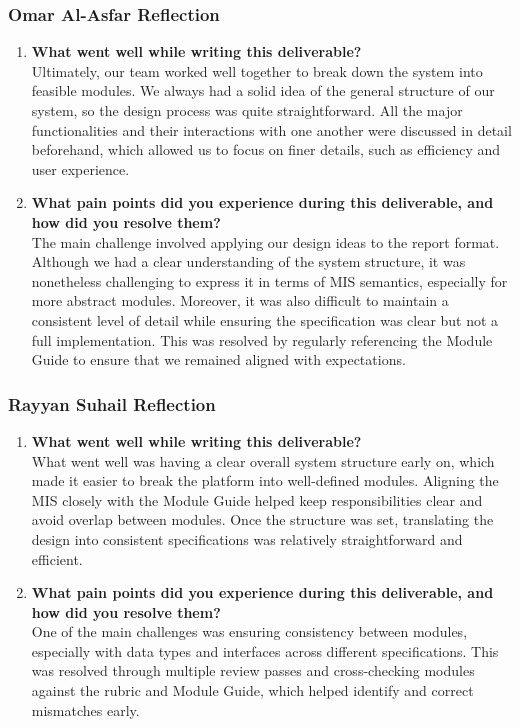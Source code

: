 \documentclass[12pt, titlepage]{article}
\begin{document}
\subsubsection*{Omar Al-Asfar Reflection}
\begin{enumerate}
 \item \textbf{What went well while writing this deliverable?} \\
 Ultimately, our team worked well together to break down the system into feasible modules. We always had a solid idea of the general structure of our system, so the design process was quite straightforward. All the major functionalities and their interactions with one another were discussed in detail beforehand, which allowed us to focus on finer details, such as efficiency and user experience.

 \item \textbf{What pain points did you experience during this deliverable, and how did you resolve them?} \\
 The main challenge involved applying our design ideas to the report format. Although we had a clear understanding of the system structure, it was nonetheless challenging to express it in terms of MIS semantics, especially for more abstract modules. Moreover, it was also difficult to maintain a consistent level of detail while ensuring the specification was clear but not a full implementation. This was resolved by regularly referencing the Module Guide to ensure that we remained aligned with expectations.
 \end {enumerate}

\subsubsection*{Rayyan Suhail Reflection}
\begin{enumerate}
\item \textbf{What went well while writing this deliverable?} \\
  What went well was having a clear overall system structure early on, which made it easier to break the platform into well-defined modules. Aligning the MIS closely with the Module Guide helped keep responsibilities clear and avoid overlap between modules. Once the structure was set, translating the design into consistent specifications was relatively straightforward and efficient.

\item \textbf{What pain points did you experience during this deliverable, and how did you resolve them?} \\
  One of the main challenges was ensuring consistency between modules, especially with data types and interfaces across different specifications. This was resolved through multiple review passes and cross-checking modules against the rubric and Module Guide, which helped identify and correct mismatches early.
\end{enumerate}
\end{document}
